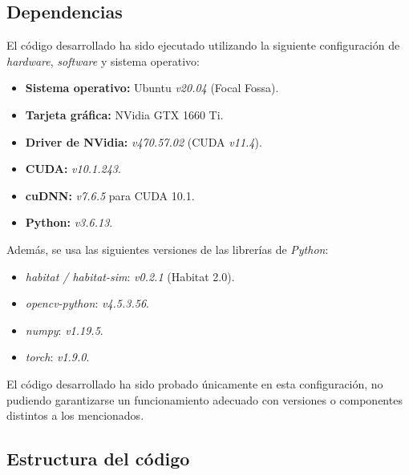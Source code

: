 \subsection{Dependencias}

El código desarrollado ha sido ejecutado utilizando la siguiente configuración de \textit{hardware}, \textit{software} y sistema operativo:

\begin{itemize}
	\item \textbf{Sistema operativo:} Ubuntu \textit{v20.04} (Focal Fossa).
	\item \textbf{Tarjeta gráfica:} NVidia GTX 1660 Ti.
	\item \textbf{Driver de NVidia:} \textit{v470.57.02} (CUDA \textit{v11.4}).
	\item \textbf{CUDA:} \textit{v10.1.243}.
	\item \textbf{cuDNN:} \textit{v7.6.5} para CUDA 10.1.
	\item \textbf{Python:} \textit{v3.6.13}.
\end{itemize}

Además, se usa las siguientes versiones de las librerías de \textit{Python}:
\begin{itemize}
	\item \textit{habitat / habitat-sim}: \textit{v0.2.1} (Habitat 2.0).
	\item \textit{opencv-python}: \textit{v4.5.3.56}.
	\item \textit{numpy}: \textit{v1.19.5}.
	\item \textit{torch}: \textit{v1.9.0}.
\end{itemize}

El código desarrollado ha sido probado únicamente en esta configuración, no pudiendo garantizarse un funcionamiento adecuado con versiones o componentes distintos a los mencionados.

\subsection{Estructura del código}

